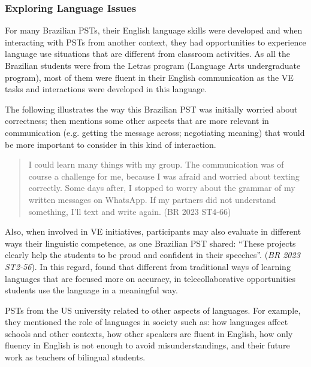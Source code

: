 \subsubsection{Exploring Language Issues}\label{sub-sub-sec-exploring}

For many Brazilian PSTs, their English language skills were developed
and when interacting with PSTs from another context, they had
opportunities to experience language use situations that are different
from classroom activities. As all the Brazilian students were from the
Letras program (Language Arts undergraduate program), most of them were
fluent in their English communication as the VE tasks and interactions
were developed in this language.

The following illustrates the way this Brazilian PST was initially
worried about correctness; then mentions some other aspects that are
more relevant in communication (e.g. getting the message across;
negotiating meaning) that would be more important to consider in this
kind of interaction.

\begin{quote}
I could learn many things with my group. The communication was of
course a challenge for me, because I was afraid and worried about
texting correctly. Some days after, I stopped to worry about the grammar
of my written messages on WhatsApp. If my partners did not understand
something, I’ll text and write again. (BR 2023
ST4-66)
\end{quote}

Also, when involved in VE initiatives, participants may also
evaluate in different ways their linguistic competence, as one Brazilian
PST shared: \enquote{These projects clearly help the students to be proud and confident in their speeches}. (\emph{BR 2023 ST2-56}). In this
regard, \textcite[p. 217]{odowd2021virtual} found that different from
traditional ways of learning languages that are focused more on
accuracy, in telecollaborative opportunities students use the language
in a meaningful way.

PSTs from the US university related to other aspects of languages. For
example, they mentioned the role of languages in society such as: how
languages affect schools and other contexts, how other speakers are
fluent in English, how only fluency in English is not enough to avoid
misunderstandings, and their future work as teachers of bilingual
students.

